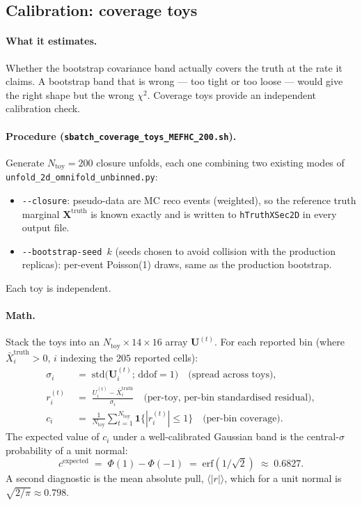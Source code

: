 \subsection{Calibration: coverage toys}
\label{sec:coverage}

\paragraph{What it estimates.}
Whether the bootstrap covariance band actually covers the truth at
the rate it claims. A bootstrap band that is wrong --- too tight or
too loose --- would give the right shape but the wrong $\chi^{2}$.
Coverage toys provide an independent calibration check.

\paragraph{Procedure (\texttt{sbatch\_coverage\_toys\_MEFHC\_200.sh}).}
Generate $N_{\text{toy}}=200$ closure unfolds, each one combining two
existing modes of \texttt{unfold\_2d\_omnifold\_unbinned.py}:
\begin{itemize}[nosep]
  \item \texttt{-{}-closure}: pseudo-data are MC reco events
        (weighted), so the reference truth marginal
        $\mathbf{X}^{\text{truth}}$ is known exactly and is written
        to \texttt{hTruthXSec2D} in every output file.
  \item \texttt{-{}-bootstrap-seed $k$} (seeds chosen to avoid
        collision with the production replicas): per-event Poisson(1)
        draws, same as the production bootstrap.
\end{itemize}
Each toy is independent.

\paragraph{Math.}
Stack the toys into an $N_{\text{toy}}\times14\times16$ array
$\mathbf{U}^{(t)}$. For each reported bin (where
$\bar X^{\text{truth}}_{i}>0$, $i$ indexing the $205$ reported cells):
\begin{align}
\sigma_{i}
\;&=\;
\mathrm{std}\big(\mathbf{U}^{(t)}_{i}; \,\text{ddof}=1\big)
\quad\text{(spread across toys)},
\\
r^{(t)}_{i}
\;&=\;
\frac{U^{(t)}_{i} - \bar X^{\text{truth}}_{i}}{\sigma_{i}}
\quad\text{(per-toy, per-bin standardised residual)},
\\
c_{i}
\;&=\;
\frac{1}{N_{\text{toy}}}
\sum_{t=1}^{N_{\text{toy}}} \mathbf{1}\!\big\{|r^{(t)}_{i}| \le 1\big\}
\quad\text{(per-bin coverage)}.
\end{align}
The expected value of $c_{i}$ under a well-calibrated Gaussian band
is the central-$\sigma$ probability of a unit normal:
\begin{equation}
c^{\text{expected}}
\;=\;
\Phi(1) - \Phi(-1)
\;=\;
\mathrm{erf}(1/\sqrt 2)
\;\approx\;
0.6827.
\end{equation}
A second diagnostic is the mean absolute pull,
$\langle |r| \rangle$, which for a unit normal is
$\sqrt{2/\pi}\approx 0.798$.

